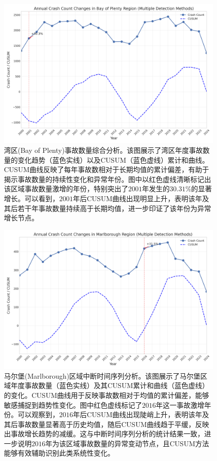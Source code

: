 \documentclass[12pt,a4paper]{article}
\begin{document}
\begin{figure}[H]
\centering
\includegraphics[height=0.3\textheight]{region_Bay_of_Plenty_Region_comprehensive.png}
\caption{湾区(Bay of Plenty)事故数量综合分析。该图展示了湾区年度事故数量的变化趋势（蓝色实线）以及CUSUM（蓝色虚线）累计和曲线。CUSUM曲线反映了每年事故数相对于长期均值的累计偏差，有助于揭示事故数量的持续性变化和异常年份。图中以红色虚线清晰标记出该区域事故数量激增的年份，特别突出了$2001$年发生的$30.31\%$的显著增长。可以看到，$2001$年后CUSUM曲线出现明显上升，表明该年及其后若干年事故数量持续高于长期均值，进一步印证了该年份为异常增长节点。}
\label{fig:bay_of_plenty_comprehensive}
\end{figure}

\begin{figure}[H]
\centering
\includegraphics[height=0.3\textheight]{region_Marlborough_Region_comprehensive.png}
\caption{马尔堡(Marlborough)区域中断时间序列分析。该图展示了马尔堡区域年度事故数量（蓝色实线）及其CUSUM累计和曲线（蓝色虚线）的变化。CUSUM曲线用于反映事故数相对于均值的累计偏差，能够敏感捕捉到趋势性变化。图中红色虚线标记了$2016$年这一事故激增年份。可以观察到，$2016$年后CUSUM曲线出现陡峭上升，表明该年及其后事故数量显著高于历史均值，随后CUSUM曲线趋于平缓，反映出事故增长趋势的减缓。这与中断时间序列分析的统计结果一致，进一步说明$2016$年为该区域事故数量的异常变动节点，且CUSUM方法能够有效辅助识别此类系统性变化。}
\label{fig:marlborough_comprehensive}
\end{figure}
\end{document}
